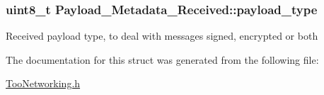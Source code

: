 \subsubsection[{\texorpdfstring{payload\+\_\+type}{payload_type}}]{\setlength{\rightskip}{0pt plus 5cm}uint8\+\_\+t Payload\+\_\+\+Metadata\+\_\+\+Received\+::payload\+\_\+type}\hypertarget{structPayload__Metadata__Received_a0105d708c3cc157a95c3cf4068e290de}{}\label{structPayload__Metadata__Received_a0105d708c3cc157a95c3cf4068e290de}
Received payload type, to deal with messages signed, encrypted or both 

The documentation for this struct was generated from the following file\+:\begin{DoxyCompactItemize}
\item 
\hyperlink{TooNetworking_8h}{Too\+Networking.\+h}\end{DoxyCompactItemize}
